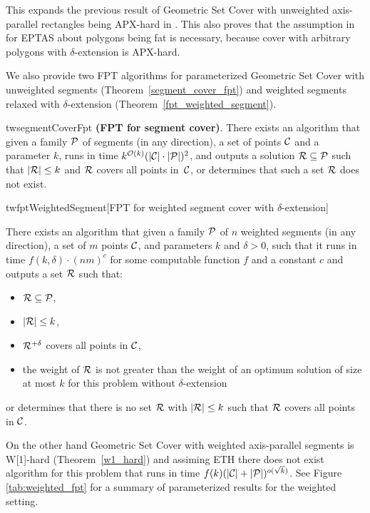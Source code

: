 This expands the previous result of Geometric Set Cover
with unweighted axis-parallel rectangles being APX-hard in \cite{rectangles_apx_hard}.
This also proves that the assumption in \cite{harpeled12}
for EPTAS about polygons being fat is necessary, because
cover with arbitrary polygons with $\delta$-extension is APX-hard.

We also provide two FPT algorithms for parameterized Geometric Set Cover 	
with unweighted segments (Theorem~\ref{segment_cover_fpt})
and weighted segments relaxed with $\delta$-extension
(Theorem~\ref{fpt_weighted_segment}).

\begin{restatable}{tw}{segmentCoverFpt}{
	\label{segment_cover_fpt}
	\textbf{(FPT for segment cover)}.
	There exists an algorithm that given a family $\mathcal{P}$ of
	segments (in any direction),
	a set of points $\mathcal{C}$
	and a parameter $k$,
	runs in time ${k^{\mathcal{O}(k)} (|\mathcal{C}|\cdot|\mathcal{P}|)^2}$,
	and outputs a solution $\mathcal{R} \subseteq \mathcal{P}$
	such that $|\mathcal{R}| \le k$ and $\mathcal{R}$ covers all points in~$\mathcal{C}$,
	or determines that such a set $\mathcal{R}$ does not exist.
}\end{restatable}

\begin{restatable}{tw}{fptWeightedSegment}[FPT for weighted segment cover with $\delta$-extension]{
	\label{fpt_weighted_segment}
	There exists an algorithm that given a family $\mathcal{P}$ of
	$n$ weighted segments (in any direction),
	a set of $m$ points $\mathcal{C}$, and parameters $k$ and $\delta > 0$,
	such that it
	runs in time $f(k, \delta) \cdot (nm)^c$ for some computable function $f$ and a constant $c$ and
	outputs a set $\mathcal{R}$ such that:
	\begin{itemize}
	\item $\mathcal{R} \subseteq \mathcal{P}$,
	\item $|\mathcal{R}| \le k$,
	\item $\mathcal{R}^{+\delta}$ covers all points in $\mathcal{C}$,
	\item the weight of $\mathcal{R}$ is not greater than the weight
	of an optimum solution of size at most $k$
	for this problem without $\delta$-extension
	\end{itemize}
	or determines that there is no set $\mathcal{R}$ with $|\mathcal{R}| \le k$
	such that $\mathcal{R}$ covers all points in $\mathcal{C}$.
}\end{restatable}

On the other hand Geometric Set Cover with weighted
axis-parallel segments is W[1]-hard (Theorem~\ref{w1_hard})
and assiming ETH there does not exist algorithm for this problem
that runs in time ${f(k)(|\mathcal{C}| + |\mathcal{P}|)^{o(\sqrt{k})}}$.
See Figure \ref{tab:weighted_fpt} for a summary of parameterized
results for the weighted setting.

